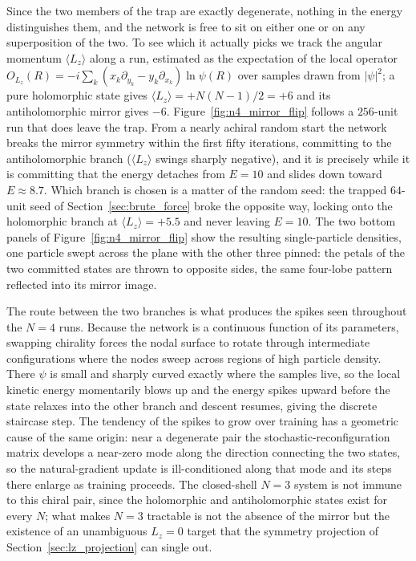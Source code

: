 \documentclass[a4paper,11pt,twoside]{article}
\begin{document}
Since the two members of the trap are exactly degenerate, nothing in the energy distinguishes them, and the network is free to sit on either one or on any superposition of the two. To see which it actually picks we track the angular momentum $\langle L_z \rangle$ along a run, estimated as the expectation of the local operator $O_{L_z}(R) = -i \sum_k (x_k \partial_{y_k} - y_k \partial_{x_k}) \ln \psi(R)$ over samples drawn from $|\psi|^2$; a pure holomorphic state gives $\langle L_z \rangle = +N(N-1)/2 = +6$ and its antiholomorphic mirror gives $-6$. Figure~\ref{fig:n4_mirror_flip} follows a $256$-unit run that does leave the trap. From a nearly achiral random start the network breaks the mirror symmetry within the first fifty iterations, committing to the antiholomorphic branch ($\langle L_z \rangle$ swings sharply negative), and it is precisely while it is committing that the energy detaches from $E = 10$ and slides down toward $E \approx 8.7$. Which branch is chosen is a matter of the random seed: the trapped $64$-unit seed of Section~\ref{sec:brute_force} broke the opposite way, locking onto the holomorphic branch at $\langle L_z \rangle = +5.5$ and never leaving $E = 10$. The two bottom panels of Figure~\ref{fig:n4_mirror_flip} show the resulting single-particle densities, one particle swept across the plane with the other three pinned: the petals of the two committed states are thrown to opposite sides, the same four-lobe pattern reflected into its mirror image.

The route between the two branches is what produces the spikes seen throughout the $N=4$ runs. Because the network is a continuous function of its parameters, swapping chirality forces the nodal surface to rotate through intermediate configurations where the nodes sweep across regions of high particle density. There $\psi$ is small and sharply curved exactly where the samples live, so the local kinetic energy momentarily blows up and the energy spikes upward before the state relaxes into the other branch and descent resumes, giving the discrete staircase step. The tendency of the spikes to grow over training has a geometric cause of the same origin: near a degenerate pair the stochastic-reconfiguration matrix develops a near-zero mode along the direction connecting the two states, so the natural-gradient update is ill-conditioned along that mode and its steps there enlarge as training proceeds. The closed-shell $N=3$ system is not immune to this chiral pair, since the holomorphic and antiholomorphic states exist for every $N$; what makes $N=3$ tractable is not the absence of the mirror but the existence of an unambiguous $L_z = 0$ target that the symmetry projection of Section~\ref{sec:lz_projection} can single out.
\end{document}
